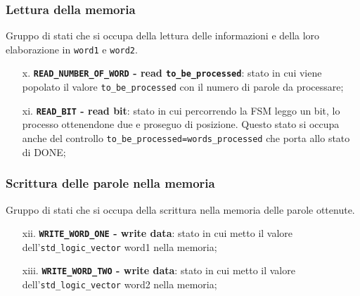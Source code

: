 \documentclass{article}
\begin{document}
\subsubsection{Lettura della memoria} %
Gruppo di stati che si occupa della lettura delle informazioni e della loro elaborazione in \texttt{word1} e \texttt{word2}.
\begin{itemize}
    \item [x.]     \textbf{\texttt{READ\_NUMBER\_OF\_WORD} - read \texttt{to\_be\_processed}}: stato in cui viene popolato il valore \texttt{to\_be\_processed} con il numero di parole da processare;
    \item [xi.]    \textbf{\texttt{READ\_BIT} - read bit}: stato in cui percorrendo la FSM leggo un bit, lo processo ottenendone due e proseguo di posizione.
    Questo stato si occupa anche del controllo \texttt{to\_be\_processed=words\_processed} che porta allo stato di DONE;
\end{itemize}

\subsubsection{Scrittura delle parole nella memoria} %
Gruppo di stati che si occupa della scrittura nella memoria delle parole ottenute.\par
\begin{itemize}
    \item [xii.]   \textbf{\texttt{WRITE\_WORD\_ONE} - write data}: stato in cui metto il valore dell'\texttt{std\_logic\_vector} word1 nella memoria;
    \item [xiii.]   \textbf{\texttt{WRITE\_WORD\_TWO} - write data}: stato in cui metto il valore dell'\texttt{std\_logic\_vector} word2 nella memoria;
\end{itemize}

\clearpage
\end{document}
